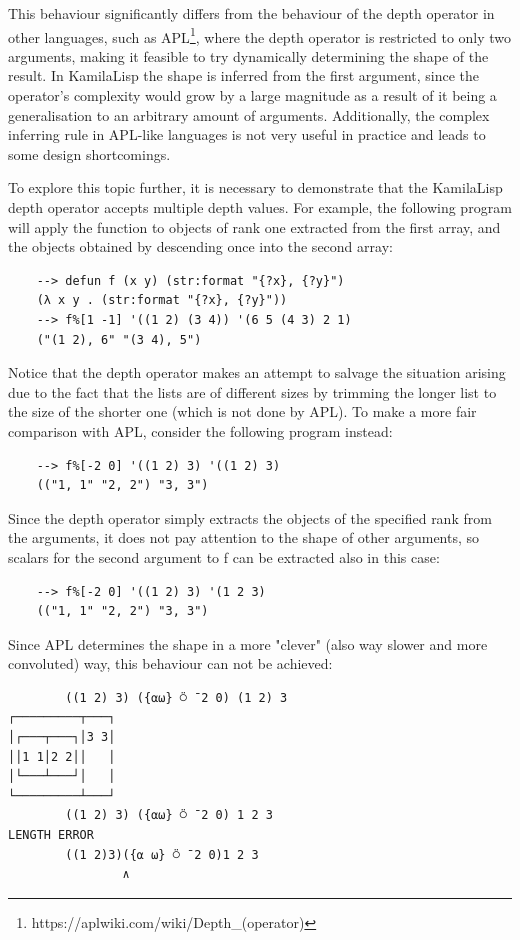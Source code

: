 This behaviour significantly differs from the behaviour of the depth operator in other languages, such as APL\footnote{https://aplwiki.com/wiki/Depth\_(operator)}, where the depth operator is restricted to only two arguments, making it feasible to try dynamically determining the shape of the result. In KamilaLisp the shape is inferred from the first argument, since the operator's complexity would grow by a large magnitude as a result of it being a generalisation to an arbitrary amount of arguments. Additionally, the complex inferring rule in APL-like languages is not very useful in practice and leads to some design shortcomings.

To explore this topic further, it is necessary to demonstrate that the KamilaLisp depth operator accepts multiple depth values. For example, the following program will apply the function to objects of rank one extracted from the first array, and the objects obtained by descending once into the second array:

\begin{Verbatim}
    --> defun f (x y) (str:format "{?x}, {?y}")
    (λ x y . (str:format "{?x}, {?y}"))
    --> f%[1 -1] '((1 2) (3 4)) '(6 5 (4 3) 2 1)
    ("(1 2), 6" "(3 4), 5")
\end{Verbatim}

Notice that the depth operator makes an attempt to salvage the situation arising due to the fact that the lists are of different sizes by trimming the longer list to the size of the shorter one (which is not done by APL). To make a more fair comparison with APL, consider the following program instead:

\begin{Verbatim}
    --> f%[-2 0] '((1 2) 3) '((1 2) 3)
    (("1, 1" "2, 2") "3, 3")
\end{Verbatim}

Since the depth operator simply extracts the objects of the specified rank from the arguments, it does not pay attention to the shape of other arguments, so scalars for the second argument to f can be extracted also in this case:

\begin{Verbatim}
    --> f%[-2 0] '((1 2) 3) '(1 2 3)
    (("1, 1" "2, 2") "3, 3")
\end{Verbatim}

Since APL determines the shape in a more "clever" (also way slower and more convoluted) way, this behaviour can not be achieved:

\begin{Verbatim}
        ((1 2) 3) ({⍺⍵} ⍥ ¯2 0) (1 2) 3
┌─────────┬───┐
│┌───┬───┐│3 3│
││1 1│2 2││   │
│└───┴───┘│   │
└─────────┴───┘
        ((1 2) 3) ({⍺⍵} ⍥ ¯2 0) 1 2 3
LENGTH ERROR
        ((1 2)3)({⍺ ⍵} ⍥ ¯2 0)1 2 3
                ∧
\end{Verbatim}

